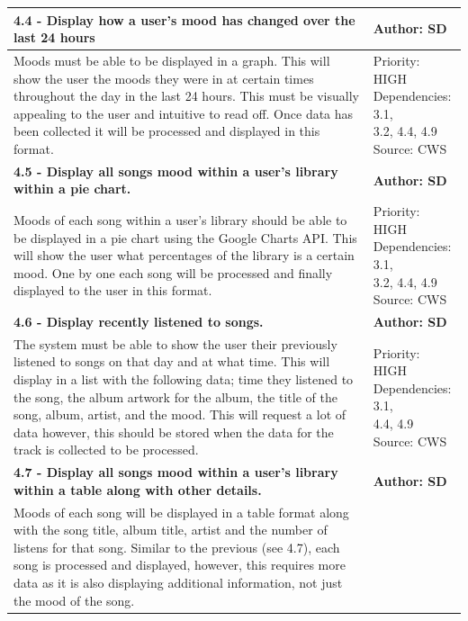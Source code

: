 \documentclass[10pt]{report}
\begin{document}
\begin{center}
\begin{longtable}{| p{13cm} | p{3cm} |}
\hline
\textbf{4.4 - Display how a user’s mood has changed over the last 24 hours} & \textbf{Author: SD} \\
\hline
Moods must be able to be displayed in a graph. This will show the user the  moods they were in at certain times throughout the day in the last 24 hours. This must be visually appealing to the user and intuitive to read off. Once data has been collected it will be processed and displayed in this format. &
\makecell{Priority: HIGH\\Dependencies: 3.1,\\3.2, 4.4, 4.9\\Source: CWS}\\
\hline
\textbf{4.5 - Display all songs mood within a user’s library within a pie chart.} & \textbf{Author: SD} \\
\hline
Moods of each song within a user’s library should be able to be displayed in a pie chart using the Google Charts API. This will show the user what percentages of the library is a certain mood. One by one each song will be processed and finally displayed to the user in this format.& 
\makecell{Priority: HIGH\\Dependencies: 3.1,\\3.2, 4.4, 4.9\\Source: CWS}\\
\hline
\textbf{4.6 - Display recently listened to songs.} & \textbf{Author: SD} \\
\hline
The system must be able to show the user their previously listened to songs on that day and at what time. This will display in a list with the following data; time they listened to the song, the album artwork for the album, the title of the song, album, artist, and the mood. This will request a lot of data however, this should be stored when the data for the track is collected to be processed.&
\makecell{Priority: HIGH\\Dependencies: 3.1,\\4.4, 4.9\\Source: CWS}\\
\hline
\textbf{4.7 - Display all songs mood within a user’s library within a table along with other details.} & \textbf{Author: SD} \\
\hline
Moods of each song will be displayed in a table format along with the song title, album title, artist and the number of listens for that song. Similar to the previous (see 4.7), each song is processed and displayed, however, this requires more data as it is also displaying additional information, not just the mood of the song. & 

\end{longtable}
\end{center}
\end{document}
